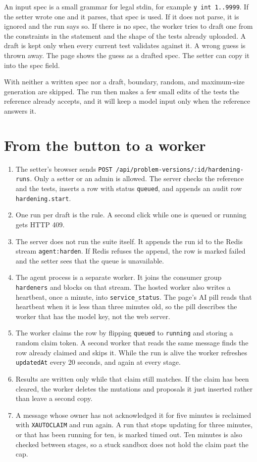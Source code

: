 \documentclass[10pt,a4paper]{article}
\begin{document}
An input spec is a small grammar for legal stdin, for example \texttt{y int 1..9999}. If the setter wrote one and it parses, that spec is used. If it does not parse, it is ignored and the run says so. If there is no spec, the worker tries to draft one from the constraints in the statement and the shape of the tests already uploaded. A draft is kept only when every current test validates against it. A wrong guess is thrown away. The page shows the guess as a drafted spec. The setter can copy it into the spec field.

With neither a written spec nor a draft, boundary, random, and maximum-size generation are skipped. The run then makes a few small edits of the tests the reference already accepts, and it will keep a model input only when the reference answers it.

\section{From the button to a worker}

\begin{enumerate}
  \item The setter's browser sends \texttt{POST /api/problem-versions/:id/hardening-runs}. Only a setter or an admin is allowed. The server checks the reference and the tests, inserts a row with status \texttt{queued}, and appends an audit row \texttt{hardening.start}.
  \item One run per draft is the rule. A second click while one is queued or running gets HTTP 409.
  \item The server does not run the suite itself. It appends the run id to the Redis stream \texttt{agent:harden}. If Redis refuses the append, the row is marked failed and the setter sees that the queue is unavailable.
  \item The agent process is a separate worker. It joins the consumer group \texttt{hardeners} and blocks on that stream. The hosted worker also writes a heartbeat, once a minute, into \texttt{service\_status}. The page's AI pill reads that heartbeat when it is less than three minutes old, so the pill describes the worker that has the model key, not the web server.
  \item The worker claims the row by flipping \texttt{queued} to \texttt{running} and storing a random claim token. A second worker that reads the same message finds the row already claimed and skips it. While the run is alive the worker refreshes \texttt{updatedAt} every 20 seconds, and again at every stage.
  \item Results are written only while that claim still matches. If the claim has been cleared, the worker deletes the mutations and proposals it just inserted rather than leave a second copy.
  \item A message whose owner has not acknowledged it for five minutes is reclaimed with \texttt{XAUTOCLAIM} and run again. A run that stops updating for three minutes, or that has been running for ten, is marked timed out. Ten minutes is also checked between stages, so a stuck sandbox does not hold the claim past the cap.
\end{enumerate}
\end{document}
